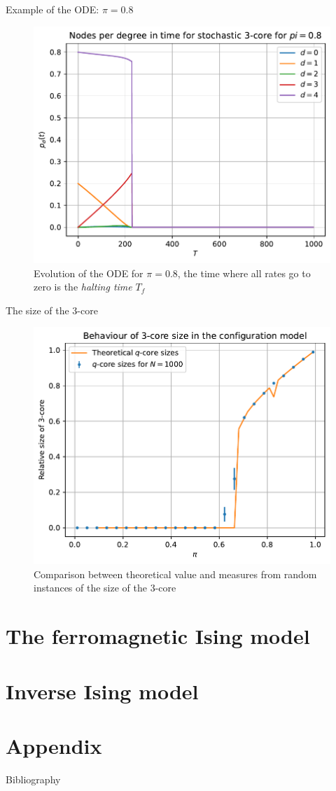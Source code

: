 \documentclass[handout]{beamer}
\begin{document}
\begin{frame}{Example of the ODE: $\pi=0.8$}
    \begin{figure}
        \centering
        \includegraphics[width=.6\textwidth]{ode_evol_pi08.pdf}
        \caption{Evolution of the ODE for $\pi=0.8$, the time where all rates
        go to zero is the \emph{halting time} $T_f$}
        \label{ref:ode_evol_pi03}
    \end{figure}
\end{frame}

\begin{frame}{The size of the 3-core}
    \begin{figure}
        \centering
        \includegraphics[height=.7\textheight]{qcore}
        \caption{Comparison between theoretical value and measures from random
        instances of the size of the 3-core}
        \label{fig:qcore}
    \end{figure}
\end{frame}

\section{The ferromagnetic Ising model}

\section{Inverse Ising model}

\section{Appendix}

\begin{frame}{Bibliography}
    \printbibliography
\end{frame}
\end{document}

